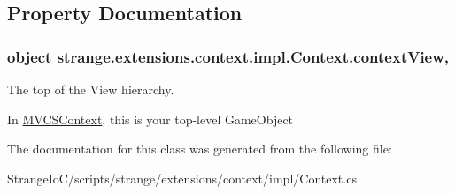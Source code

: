 \subsection{Property Documentation}
\hypertarget{classstrange_1_1extensions_1_1context_1_1impl_1_1_context_a6403b0233cce89fdf38d810c740795c2}{
\subsubsection[{context\-View}]{\setlength{\rightskip}{0pt plus 5cm}object strange.\-extensions.\-context.\-impl.\-Context.\-context\-View\hspace{0.3cm}{\ttfamily [get]}, {\ttfamily [set]}}}\label{classstrange_1_1extensions_1_1context_1_1impl_1_1_context_a6403b0233cce89fdf38d810c740795c2}


The top of the View hierarchy. 

In \hyperlink{classstrange_1_1extensions_1_1context_1_1impl_1_1_m_v_c_s_context}{M\-V\-C\-S\-Context}, this is your top-\/level Game\-Object 

The documentation for this class was generated from the following file\-:\begin{DoxyCompactItemize}
\item 
Strange\-Io\-C/scripts/strange/extensions/context/impl/Context.\-cs\end{DoxyCompactItemize}
